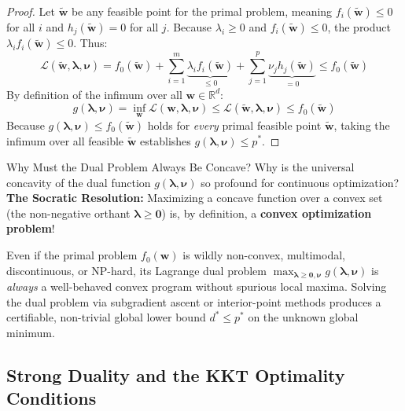 \begin{proof}
Let $\tilde{\mathbf{w}}$ be any feasible point for the primal problem, meaning $f_i(\tilde{\mathbf{w}}) \le 0$ for all $i$ and $h_j(\tilde{\mathbf{w}}) = 0$ for all $j$.
Because $\lambda_i \ge 0$ and $f_i(\tilde{\mathbf{w}}) \le 0$, the product $\lambda_i f_i(\tilde{\mathbf{w}}) \le 0$. Thus:
\begin{equation}
\mathcal{L}(\tilde{\mathbf{w}}, \boldsymbol{\lambda}, \boldsymbol{\nu}) = f_0(\tilde{\mathbf{w}}) + \sum_{i=1}^m \underbrace{\lambda_i f_i(\tilde{\mathbf{w}})}_{\le 0} + \sum_{j=1}^p \underbrace{\nu_j h_j(\tilde{\mathbf{w}})}_{= 0} \le f_0(\tilde{\mathbf{w}})
\end{equation}
By definition of the infimum over all $\mathbf{w} \in \mathbb{R}^d$:
\begin{equation}
g(\boldsymbol{\lambda}, \boldsymbol{\nu}) = \inf_{\mathbf{w}} \mathcal{L}(\mathbf{w}, \boldsymbol{\lambda}, \boldsymbol{\nu}) \le \mathcal{L}(\tilde{\mathbf{w}}, \boldsymbol{\lambda}, \boldsymbol{\nu}) \le f_0(\tilde{\mathbf{w}})
\end{equation}
Because $g(\boldsymbol{\lambda}, \boldsymbol{\nu}) \le f_0(\tilde{\mathbf{w}})$ holds for \emph{every} primal feasible point $\tilde{\mathbf{w}}$, taking the infimum over all feasible $\tilde{\mathbf{w}}$ establishes $g(\boldsymbol{\lambda}, \boldsymbol{\nu}) \le p^*$.
\end{proof}

\begin{ponderbox}{Why Must the Dual Problem Always Be Concave?}
Why is the universal concavity of the dual function $g(\boldsymbol{\lambda}, \boldsymbol{\nu})$ so profound for continuous optimization?
\tcblower
\textbf{The Socratic Resolution:} Maximizing a concave function over a convex set (the non-negative orthant $\boldsymbol{\lambda} \ge \mathbf{0}$) is, by definition, a \textbf{convex optimization problem}! 

Even if the primal problem $f_0(\mathbf{w})$ is wildly non-convex, multimodal, discontinuous, or NP-hard, its Lagrange dual problem $\max_{\boldsymbol{\lambda} \ge \mathbf{0}, \boldsymbol{\nu}} g(\boldsymbol{\lambda}, \boldsymbol{\nu})$ is \emph{always} a well-behaved convex program without spurious local maxima. Solving the dual problem via subgradient ascent or interior-point methods produces a certifiable, non-trivial global lower bound $d^* \le p^*$ on the unknown global minimum.
\end{ponderbox}

\subsection{Strong Duality and the KKT Optimality Conditions}


